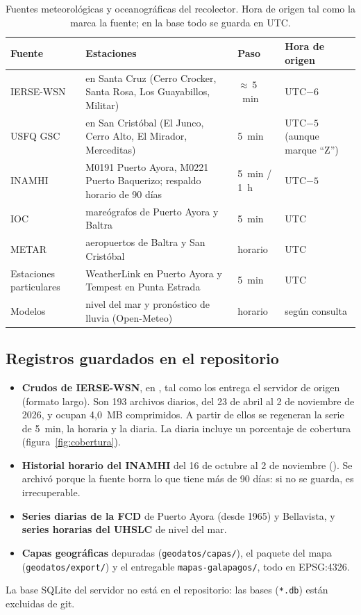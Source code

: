 \documentclass{sosg-informe}
\begin{document}
\begin{table}[ht]
  \centering\small
  \caption{Fuentes meteorológicas y oceanográficas del recolector. Hora de origen tal como la marca la fuente; en la base todo se guarda en UTC.}
  \label{tab:fuentes}
  \begin{tabularx}{\linewidth}{l>{\raggedright\arraybackslash}Xll}
    \toprule
    Fuente & Estaciones & Paso & Hora de origen \\
    \midrule
    IERSE-WSN & 4 en Santa Cruz (Cerro Crocker, Santa Rosa, Los Guayabillos, Militar) & ${\approx}\,5$~min & UTC$-6$ \\
    USFQ GSC & 4 en San Cristóbal (El Junco, Cerro Alto, El Mirador, Merceditas) & 5~min & UTC$-5$ (aunque marque \enquote{Z}) \\
    INAMHI & M0191 Puerto Ayora, M0221 Puerto Baquerizo; respaldo horario de 90 días & 5~min / 1~h & UTC$-5$ \\
    IOC & mareógrafos de Puerto Ayora y Baltra & 5~min & UTC \\
    METAR & aeropuertos de Baltra y San Cristóbal & horario & UTC \\
    Estaciones particulares & WeatherLink en Puerto Ayora y Tempest en Punta Estrada & 5~min & UTC \\
    Modelos & nivel del mar y pronóstico de lluvia (Open-Meteo) & horario & según consulta \\
    \bottomrule
  \end{tabularx}
\end{table}

\subsection{Registros guardados en el repositorio}
\begin{itemize}
  \item \textbf{Crudos de IERSE-WSN}, en , tal como los entrega el servidor de origen (formato largo). Son 193 archivos diarios, del 23 de abril al 2 de noviembre de 2026, y ocupan 4,0~MB comprimidos. A partir de ellos se regeneran la serie de 5~min, la horaria y la diaria. La diaria incluye un porcentaje de cobertura (figura~\ref{fig:cobertura}).
  \item \textbf{Historial horario del INAMHI} del 16 de octubre al 2 de noviembre (). Se archivó porque la fuente borra lo que tiene más de 90 días: si no se guarda, es irrecuperable.
  \item \textbf{Series diarias de la FCD} de Puerto Ayora (desde 1965) y Bellavista, y \textbf{series horarias del UHSLC} de nivel del mar.
  \item \textbf{Capas geográficas} depuradas (\texttt{geodatos/capas/}), el paquete del mapa (\texttt{geodatos/export/}) y el entregable \texttt{mapas-galapagos/}, todo en EPSG:4326.
\end{itemize}
La base SQLite del servidor no está en el repositorio: las bases (\texttt{*.db}) están excluidas de git.
\end{document}
